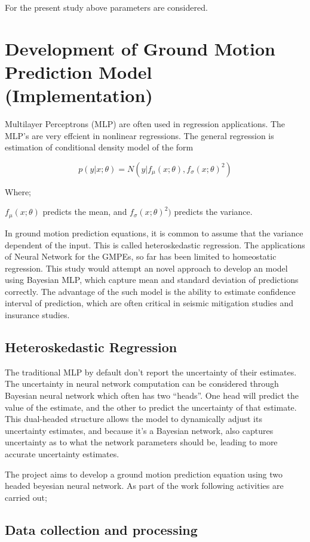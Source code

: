 \documentclass[a4paper,10pt]{article}
\begin{document}
For the present study above parameters are considered.

\section{Development of Ground Motion Prediction Model (Implementation)}
Multilayer Perceptrons (MLP) are often used in regression applications. The MLP's are very effcient in nonlinear regressions. 
The general regression is estimation of conditional density model of the form


$$ p(y | x; \theta) = N(y | f_{\mu}(x;\theta), f_{\sigma}(x;\theta)^2) $$

Where;

$f_{\mu}(x;\theta)$ predicts the mean, and $f_{\sigma}(x;\theta)^2)$ predicts the variance.

In ground motion prediction equations, it is common to assume that the variance dependent of the input. 
This is called heteroskedastic regression.
The applications of Neural Network for the GMPEs, so far has been limited to homeostatic regression.
This study would attempt an novel approach to develop an model using Bayesian MLP, which capture mean and standard deviation of predictions correctly.
The advantage of the such model is the ability to estimate confidence interval of prediction, which are often critical in seismic mitigation studies and insurance studies.

\subsection{Heteroskedastic Regression}
The traditional MLP by default don’t report the uncertainty of their estimates.
The uncertainty in neural network computation can be considered through Bayesian neural network which often has two “heads”. One head will predict the value of the estimate, and the other to predict the uncertainty of that estimate. This dual-headed structure allows the model to dynamically adjust its uncertainty estimates, and because it’s a Bayesian network, also captures uncertainty as to what the network parameters should be, leading to more accurate uncertainty estimates.

The project aims to develop a ground motion prediction equation using two headed beyesian neural network. As part of the work following activities are carried out;

\subsection{Data collection and processing}
\end{document}
